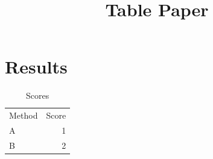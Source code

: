 \documentclass{article}
\title{Table Paper}
\begin{document}
\maketitle
\section{Results}
\begin{table}
\caption{Scores}
\begin{tabular}{lr}
Method & Score \\
A & 1 \\
B & 2 \\
\end{tabular}
\end{table}
\end{document}
